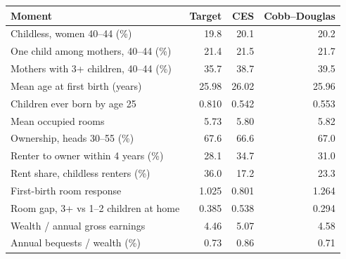 \begin{tabularx}{\textwidth}{@{}Xrrr@{}}
\toprule
Moment & Target & CES & Cobb--Douglas \\
\midrule
Childless, women 40--44 (\%) & 19.8 & 20.1 & 20.2 \\
One child among mothers, 40--44 (\%) & 21.4 & 21.5 & 21.7 \\
Mothers with 3+ children, 40--44 (\%) & 35.7 & 38.7 & 39.5 \\
Mean age at first birth (years) & 25.98 & 26.02 & 25.96 \\
Children ever born by age 25 & 0.810 & 0.542 & 0.553 \\
\addlinespace[3pt]
Mean occupied rooms & 5.73 & 5.80 & 5.82 \\
Ownership, heads 30--55 (\%) & 67.6 & 66.6 & 67.0 \\
Renter to owner within 4 years (\%) & 28.1 & 34.7 & 31.0 \\
Rent share, childless renters (\%) & 36.0 & 17.2 & 23.3 \\
First-birth room response & 1.025 & 0.801 & 1.264 \\
Room gap, 3+ vs 1--2 children at home & 0.385 & 0.538 & 0.294 \\
\addlinespace[3pt]
Wealth / annual gross earnings & 4.46 & 5.07 & 4.58 \\
Annual bequests / wealth (\%) & 0.73 & 0.86 & 0.71 \\
\bottomrule
\end{tabularx}

